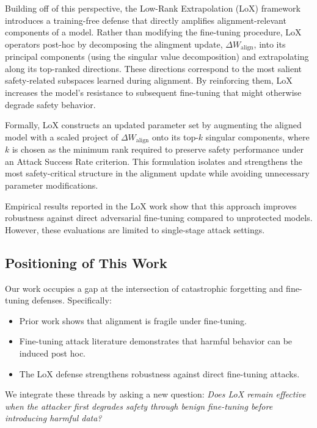 \documentclass[letterpaper,twocolumn,10pt]{article}
\begin{document}
Building off of this perspective, the Low-Rank Extrapolation (LoX) framework introduces a training-free defense that directly amplifies alignment-relevant components of a model. Rather than modifying the fine-tuning procedure, LoX operators post-hoc by decomposing the alingment update, $\Delta W_{\mbox{align}}$, into its principal components (using the singular value decomposition) and extrapolating along its top-ranked directions. These directions correspond to the most salient safety-related subspaces learned during alignment. By reinforcing them, LoX increases the model's resistance to subsequent fine-tuning that might otherwise degrade safety behavior. 

Formally, LoX constructs an updated parameter set by augmenting the aligned model with a scaled project of $\Delta W_{\mbox{align}}$ onto its top-$k$ singular components, where $k$ is chosen as the minimum rank required to preserve safety performance under an Attack Success Rate criterion. This formulation isolates and strengthens the most safety-critical structure in the alignment update while avoiding unnecessary parameter modifications.

Empirical results reported in the LoX work show that this approach improves robustness against direct adversarial fine-tuning compared to unprotected models. However, these evaluations are limited to single-stage attack settings.

\subsection{Positioning of This Work}

Our work occupies a gap at the intersection of catastrophic forgetting and fine-tuning defenses. Specifically:

\begin{itemize}
    \item Prior work shows that alignment is fragile under fine-tuning.
    \item Fine-tuning attack literature demonstrates that harmful behavior can be induced post hoc.
    \item The LoX defense strengthens robustness against direct fine-tuning attacks.
\end{itemize}

We integrate these threads by asking a new question: \emph{Does LoX remain effective when the attacker first degrades safety through benign fine-tuning before introducing harmful data?}
\end{document}
